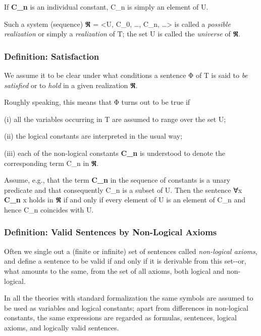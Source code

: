 If \textbf{C\_n} is an individual constant, C\_n is simply an element of
U.

Such a system (sequence) 𝕽 = \textless U, C\_0, \ldots, C\_n,
\ldots\textgreater{} is called a \emph{possible realization} or simply a
\emph{realization} of T; the set U is called the \emph{universe} of 𝕽.

\hypertarget{definition-satisfaction}{%
\subsubsection{Definition: Satisfaction}\label{definition-satisfaction}}

We assume it to be clear under what conditions a sentence Φ of T is said
to \emph{be satisfied} or to \emph{hold} in a given realization 𝕽.

Roughly speaking, this means that Φ turns out to be true if

(i) all the variables occurring in T are assumed to range over the set
U;

(ii) the logical constants are interpreted in the usual way;

(iii) each of the non-logical constants \textbf{C\_n} is understood to
denote the corresponding term C\_n in 𝕽.

Assume, e.g., that the term \textbf{C\_n} in the sequence of constants
is a unary predicate and that consequently C\_n is a subset of U. Then
the sentence ∀x \textbf{C\_n} x holds in 𝕽 if and only if every element
of U is an element of C\_n and hence C\_n coincides with U.

\hypertarget{definition-valid-sentences-by-non-logical-axioms}{%
\subsubsection{Definition: Valid Sentences by Non-Logical
Axioms}\label{definition-valid-sentences-by-non-logical-axioms}}

Often we single out a (finite or infinite) set of sentences called
\emph{non-logical axioms}, and define a sentence to be valid if and only
if it is derivable from this set-\/-or, what amounts to the same, from
the set of all axioms, both logical and non-logical.

In all the theories with standard formalization the same symbols are
assumed to be used as variables and logical constants; apart from
differences in non-logical constants, the same expressions are regarded
as formulas, sentences, logical axioms, and logically valid sentences.

